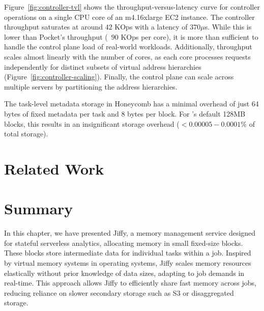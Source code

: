 Figure~\ref{fig:controller-tvl} shows the throughput-versus-latency curve for \jiffy controller operations on a single CPU core of an m4.16xlarge EC2 instance. The controller throughput saturates at around $42$ KOps with a latency of $370\mu$s. While this is lower than Pocket's throughput (~$90$ KOps per core), it is more than sufficient to handle the control plane load of real-world workloads. Additionally, throughput scales almost linearly with the number of cores, as each core processes requests independently for distinct subsets of virtual address hierarchies (Figure~\ref{fig:controller-scaling}). Finally, the control plane can scale across multiple servers by partitioning the address hierarchies.

 The task-level metadata storage in Honeycomb has a minimal overhead of just 64 bytes of fixed metadata per task and 8 bytes per block. For \jiffy's default 128MB blocks, this results in an insignificant storage overhead ($<0.00005-0.0001\%$ of total storage).

\section{Related Work}

\section{Summary}
\label{sec:jiffysummary}
In this chapter, we have presented Jiffy, a memory management service designed for stateful serverless analytics, allocating memory in small fixed-size blocks. These blocks store intermediate data for individual tasks within a job. Inspired by virtual memory systems in operating systems, Jiffy scales memory resources elastically without prior knowledge of data sizes, adapting to job demands in real-time. This approach allows Jiffy to efficiently share fast memory across jobs, reducing reliance on slower secondary storage such as S3 or disaggregated storage.








